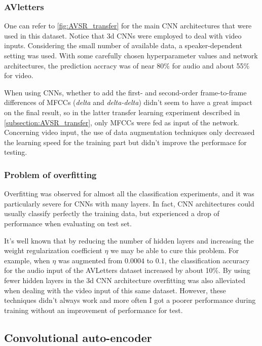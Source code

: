 \subsubsection{AVletters}

One can refer to \autoref{fig:AVSR_transfer} for the main CNN architectures
that were used in this dataset. 
Notice that 3d CNNs were employed to deal with video inputs.
Considering the small number of available data, a speaker-dependent
setting was used.
With some carefully chosen hyperparameter values and network architectures,
the prediction accracy was of near 80\% for audio and about 55\% for video.

When using CNNs, whether to add the first- and second-order frame-to-frame
differences of MFCCs (\textit{delta} and \textit{delta-delta}) didn't seem
to have a great impact on the final result, so in the latter transfer
learning experiment described in \ref{subsection:AVSR_transfer}, only
MFCCs were fed as input of the network.
Concerning video input, the use of data augmentation techniques only
decreased the learning speed for the training part but didn't improve
the performace for testing.

\subsubsection{Problem of overfitting}

Overfitting was observed for almost all the classification
experiments, and it was particularly severe for
CNNs with many layers.
In fact, CNN architectures could usually classify
perfectly the training data, but experienced a drop of performance
when evaluating on test set.

It's well known that by reducing the number of hidden layers and
increasing the weight regularization coefficient $\eta$ we may
be able to cure this problem.
For example, when $\eta$ was augmented from $0.0004$ to $0.1$,
the classification accuracy for the audio input of the AVLetters
dataset increased by about 10\%.
By using fewer hidden layers in the 3d CNN architecture overfitting
was also alleviated when dealing with the video input of this same dataset.
However, these techniques didn't always work
and more often I got a poorer performance during training without
an improvement of performance for test.

\subsection{Convolutional auto-encoder} \label{subsection:CAE}

